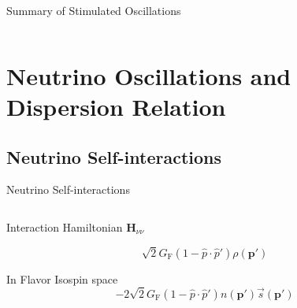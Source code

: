 \documentclass[9pt]{beamer}
\begin{document}
\begin{darkframes}
\begin{frame}{Summary of Stimulated Oscillations}
\begin{columns}[T]
\begin{column}{0.4\textwidth}
{}

\end{column}
\end{columns}

\end{frame}







\section{Neutrino Oscillations and Dispersion Relation}

\subsection{Neutrino Self-interactions}

\begin{frame}{Neutrino Self-interactions}


\begin{columns}[T]
   \begin{column}{0.35\textwidth}

      Interaction Hamiltonian $\mathbf H_{\nu\nu}$

      \begin{equation*}
         \sqrt{2}G_{\mathrm F} (1- \hat p \cdot \hat p') \rho( \mathbf p' )
      \end{equation*}

      In Flavor Isospin space
      \begin{equation*}
         -2\sqrt{2}G_{\mathrm F} (1- \hat p \cdot \hat p') n(\mathbf p') \vec s ( \mathbf p' )
      \end{equation*}


\end{column}
\end{columns}
\end{frame}
\end{darkframes}
\end{document}
